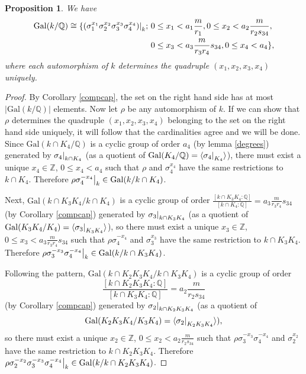 \documentclass[12pt,a4paper]{article}
\newtheorem{prop}[theorem]{Proposition}
\newcommand{\Qbb}{\mathbb{Q}}
\newcommand{\Q}{\mathbb{Q}}
\newcommand{\Z}{\mathbb{Z}}
\newcommand{\Gal}{\mathrm{Gal}}
\newcommand\restr[2]{{%
  \left.\kern-\nulldelimiterspace %
  #1 %
  \right|_{#2} %
  }}
\begin{document}
\begin{prop}\label{gal}
We have 
\begin{equation*}
\begin{split}
\Gal(k/\Qbb)\cong
 \{\restr{\left(\sigma_1^{x_1}\sigma_2^{x_2}\sigma_3^{x_3}\sigma_4^{x_4}\right)}{k};~ & 0\leq x_1<a_1\frac{m}{r_1}, 0\leq x_2<a_2\frac{m}{r_2s_{34}}, \\ & 0\leq x_3<a_3\frac{m}{r_3r_4}s_{34},0\leq x_4<a_4\},
\end{split}
\end{equation*}
where each automorphism of $k$ determines the quadruple $(x_1,x_2,x_3,x_4)$ uniquely.
\end{prop}
\begin{proof}
By Corollary \ref{compcap}, the set on the right hand side has at most $|\Gal(k/\Qbb)|$ elements. Now let $\rho$ be any automorphism of $k$. If we can show that $\rho$ determines the quadruple $(x_1,x_2,x_3,x_4)$ belonging to the set on the right hand side uniquely, it will follow that the cardinalities agree and we will be done. Since $\Gal(k\cap K_4/\Q)$ is a cyclic group of order $a_4$ (by lemma \ref{degrees}) generated by $\restr{\sigma_4}{k\cap K_4}$ (as a quotient of $\Gal(K_4/\Q)=\langle \restr{\sigma_4}{K_4}\rangle$), there must exist a unique $x_4\in \Z$, $0\leq x_4<a_4$ such that $\rho$ and $\sigma_4^{x_4}$ have the same restrictions to $k\cap K_4$. Therefore $\rho\restr{\sigma_4^{-x_4}}{k}\in \Gal(k/k\cap K_4)$. 

Next, $\Gal(k\cap K_3K_4/k\cap K_4)$ is a cyclic group of order $\frac{[k\cap K_3K_4:\Q]}{[k\cap K_4:\Q]}=a_3\frac{m}{r_3r_4}s_{34}$ (by Corollary \ref{compcap}) generated by $\restr{\sigma_3}{k\cap K_3K_4}$ (as a quotient of $\Gal(K_3K_4/K_4)=\langle \restr{\sigma_3}{K_3K_4}\rangle$), so there must exist a unique $x_3\in \Z$, $0\leq x_3<a_3\frac{m}{r_3r_4}s_{34}$ such that $\rho\sigma_4^{-x_4}$ and $\sigma_3^{x_3}$ have the same restriction to $k\cap K_3K_4$. Therefore $\restr{\rho\sigma_3^{-x_3}\sigma_4^{-x_4}}{k}\in \Gal(k/k\cap K_3K_4)$.

Following the pattern, $\Gal(k\cap K_2K_3K_4/k\cap K_3K_4)$ is a cyclic group of order 
$$\frac{[k\cap K_2K_3K_4:\Q]}{[k\cap K_3K_4:\Q]}=a_2\frac{m}{r_2s_{34}}$$ (by Corollary \ref{compcap}) generated by $\restr{\sigma_2}{k\cap K_2K_3K_4}$ (as a quotient of $$\Gal(K_2K_3K_4/K_3K_4)=\langle \restr{\sigma_2}{K_2K_3K_4}\rangle),$$ so there must exist a unique $x_2\in \Z$, $0\leq x_2<a_2\frac{m}{r_2s_{34}}$ such that $\rho\sigma_3^{-x_3}\sigma_4^{-x_4}$ and $\sigma_2^{x_2}$ have the same restriction to $k\cap K_2K_3K_4$. Therefore $\restr{\rho\sigma_2^{-x_2}\sigma_3^{-x_3}\sigma_4^{-x_4}}{k}\in \Gal(k/k\cap K_2K_3K_4)$.


\end{proof}
\end{document}

